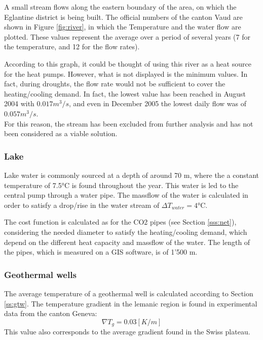 \documentclass{article}
\begin{document}
A small stream flows along the eastern boundary of the area, on which the Eglantine district is being built. The official numbers of the canton Vaud \cite{veillehydro-meteorologiqueducantondevaudMorgesRiviereDebit} are shown in Figure \ref{fig:river}, in which the Temperature and the water flow are plotted. These values represent the average over a period of several years (7 for the temperature, and 12 for the flow rates). 



According to this graph, it could be thought of using this river as a heat source for the heat pumps. However, what is not displayed is the minimum values. In fact, during droughts, the flow rate would not be sufficient to cover the heating/cooling demand. In fact, the lowest value has been reached in August 2004 with $0.017 m^3/s$, and even in December 2005 the lowest daily flow was of $0.057 m^3/s$. \\
For this reason, the stream has been excluded from further analysis and has not been considered as a viable solution.

\subsubsection{Lake}
Lake water is commonly sourced at a depth of around 70 m, where the a constant temperature of 7.5\si{\celsius} is found throughout the year. This water is led to the central pump through a water pipe. The massflow of the water is calculated in order to satisfy a drop/rise in the water stream of $\Delta T_{water}  = 4 \si{\celsius}$.

The cost function is calculated as for the CO2 pipes (see Section \ref{sss:net}), considering the needed diameter to satisfy the heating/cooling demand, which depend on the different heat capacity and massflow of the water. The length of the pipes, which is measured on a GIS software, is of 1'500 m.


\subsubsection{Geothermal wells}
The average temperature of a geothermal well is calculated according to Section \ref{ss:gtw}. The temperature gradient in the lemanic region is found in experimental data from the canton Geneva\cite{gadzEvaluationPotentielGeothermique2011}:
\begin{equation}
	\nabla T_{g} = 0.03 [K/m]
\end{equation}
This value also corresponds to the average gradient found in the Swiss plateau\cite{siaSIA384Sondes2010}.
\end{document}
